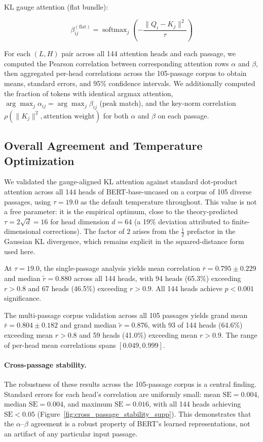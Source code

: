 \documentclass[twoside,11pt]{article}
\begin{document}
KL gauge attention (flat bundle):

\begin{equation}
\beta^{(\mathrm{flat})}_{ij} = \operatorname{softmax}_j\!\left( -\frac{\|Q_i - K_j\|^2}{\tau} \right)
\end{equation}

For each $(L,H)$ pair across all 144 attention heads and each passage, we computed the Pearson correlation between corresponding attention rows $\alpha$ and $\beta$, then aggregated per-head correlations across the 105-passage corpus to obtain means, standard errors, and 95\% confidence intervals. We additionally computed the fraction of tokens with identical argmax attention, $\arg\max_j \alpha_{ij} = \arg\max_j \beta_{ij}$ (peak match), and the key-norm correlation $\rho(\|K_j\|^2, \text{attention weight})$ for both $\alpha$ and $\beta$ on each passage.

\subsection{Overall Agreement and Temperature Optimization}

We validated the gauge-aligned KL attention against standard dot-product attention across all 144 heads of BERT-base-uncased on a corpus of 105 diverse passages, using $\tau = 19.0$ as the default temperature throughout. This value is not a free parameter: it is the empirical optimum, close to the theory-predicted $\tau = 2\sqrt{d} = 16$ for head dimension $d = 64$ (a 19\% deviation attributed to finite-dimensional corrections). The factor of $2$ arises from the $\frac{1}{2}$ prefactor in the Gaussian KL divergence, which remains explicit in the squared-distance form used here.

At $\tau = 19.0$, the single-passage analysis yields mean correlation $\bar{r} = 0.795 \pm 0.229$ and median $\tilde{r} = 0.880$ across all 144 heads, with 94 heads (65.3\%) exceeding $r > 0.8$ and 67 heads (46.5\%) exceeding $r > 0.9$. All 144 heads achieve $p < 0.001$ significance.

The multi-passage corpus validation across all 105 passages yields grand mean $\bar{r} = 0.804 \pm 0.182$ and grand median $\tilde{r} = 0.876$, with 93 of 144 heads (64.6\%) exceeding mean $r > 0.8$ and 59 heads (41.0\%) exceeding mean $r > 0.9$. The range of per-head mean correlations spans $[0.049, 0.999]$.

\paragraph{Cross-passage stability.} The robustness of these results across the 105-passage corpus is a central finding. Standard errors for each head's correlation are uniformly small: mean $\mathrm{SE} = 0.004$, median $\mathrm{SE} = 0.004$, and maximum $\mathrm{SE} = 0.016$, with all 144 heads achieving $\mathrm{SE} < 0.05$ (Figure~\ref{fig:cross_passage_stability_supp}). This demonstrates that the $\alpha$--$\beta$ agreement is a robust property of BERT's learned representations, not an artifact of any particular input passage.
\end{document}
